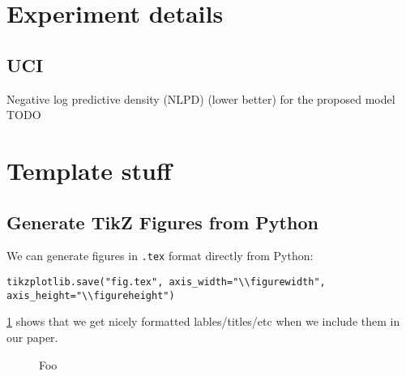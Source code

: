 \documentclass{article}
\newlength{\tblw}
\newlength{\figurewidth}
\newlength{\figureheight}
\begin{document}
\section{Experiment details}

\subsection{UCI}

\begin{table}[t!] 
  \centering\scriptsize
  \caption{Negative log predictive density (NLPD) (lower better) for the proposed model TODO} 
	\label{tbl:uci_all}
	\renewcommand{\arraystretch}{1.}
	\setlength{\tabcolsep}{2pt}
	\setlength{\tblw}{0.14\textwidth}  
	
	\newcommand{\val}[2]{%
		$#1$\textcolor{gray}{\tiny ${\pm}#2$}
	} 

	
\end{table}

\section{Template stuff}
\subsection{Generate TikZ Figures from Python}
We can generate figures in \texttt{.tex} format directly from Python:
\begin{verbatim}
tikzplotlib.save("fig.tex", axis_width="\\figurewidth", axis_height="\\figureheight")
\end{verbatim}
\cref{fig:example} shows that we get nicely formatted lables/titles/etc when we include them in our paper.
\begin{figure}[h]
    \centering\footnotesize

    \setlength{\figurewidth}{.33\textwidth}
    \setlength{\figureheight}{.75\figurewidth}


    \begin{subfigure}{.4\textwidth}
        \centering
        
    \end{subfigure}
    \hfill
    \begin{subfigure}{.4\textwidth}
        \centering
        
    \end{subfigure}
    \caption{Foo}
    \label{fig:example}
\end{figure}
\end{document}
